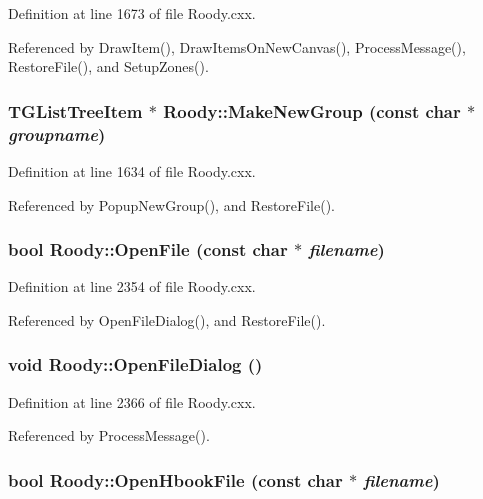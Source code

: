 Definition at line 1673 of file Roody.cxx.

Referenced by DrawItem(), DrawItemsOnNewCanvas(), ProcessMessage(), RestoreFile(), and SetupZones().
\subsubsection[{MakeNewGroup}]{\setlength{\rightskip}{0pt plus 5cm}TGListTreeItem $\ast$ Roody::MakeNewGroup (const char $\ast$ {\em groupname})\hspace{0.3cm}{\ttfamily  [private]}}\label{classRoody_a8c63a0dfcd640bff1ce2a625f9a2fb0d}


Definition at line 1634 of file Roody.cxx.

Referenced by PopupNewGroup(), and RestoreFile().
\subsubsection[{OpenFile}]{\setlength{\rightskip}{0pt plus 5cm}bool Roody::OpenFile (const char $\ast$ {\em filename})}\label{classRoody_a779ae49b4fdeeb1a0ce60720fc641032}


Definition at line 2354 of file Roody.cxx.

Referenced by OpenFileDialog(), and RestoreFile().
\subsubsection[{OpenFileDialog}]{\setlength{\rightskip}{0pt plus 5cm}void Roody::OpenFileDialog ()\hspace{0.3cm}{\ttfamily  [private]}}\label{classRoody_a87ebeb82cb802a897c66df3a8df49738}


Definition at line 2366 of file Roody.cxx.

Referenced by ProcessMessage().
\subsubsection[{OpenHbookFile}]{\setlength{\rightskip}{0pt plus 5cm}bool Roody::OpenHbookFile (const char $\ast$ {\em filename})\hspace{0.3cm}{\ttfamily  [private]}}\label{classRoody_a5f03fdc9c7abe3a565da4be5d5e7251c}


